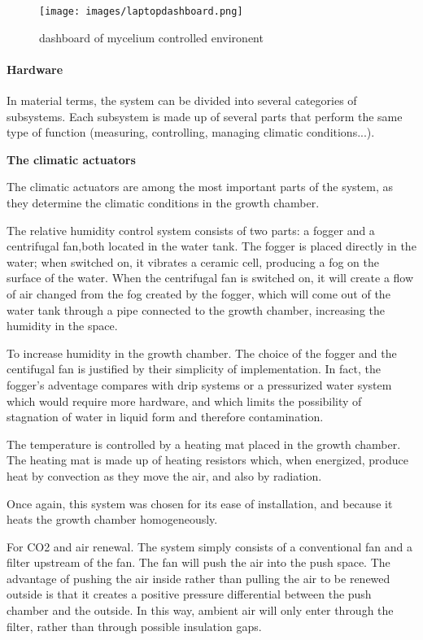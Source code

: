\begin{figure}[h]
    \centering
    \texttt{[image: images/laptopdashboard.png]}
    \caption{dashboard of mycelium controlled environent}
    \label{fig:Mycemachinne}
\end{figure} 

\paragraph{Hardware}

In material terms, the system can be divided into several categories of subsystems. 
Each subsystem is made up of several parts that perform the same type of function (measuring, controlling, managing climatic conditions...). 

\textbf{The climatic actuators} 

The climatic actuators are among the most important parts of the system, as they determine the climatic conditions in the growth chamber. 

The relative humidity control system consists of two parts: a fogger and a centrifugal fan,both located in the water tank. 
The fogger is placed directly in the water; when switched on, it vibrates a ceramic cell, producing a fog on the surface of the water. 
When the centrifugal fan is switched on, it will create a flow of air changed from the fog created by the fogger, which will come out of the water tank through a pipe connected to the growth chamber, increasing the humidity in the space. 

To increase humidity in the growth chamber. The choice of the fogger and the centifugal fan is justified by their simplicity of implementation. In fact, the fogger's adventage compares with drip systems or a pressurized water system which would require more hardware, and which limits the possibility of stagnation of water in liquid form and therefore contamination. 

The temperature is controlled by a heating mat placed in the growth chamber. The heating mat is made up of heating resistors which, when energized, produce heat by convection as they move the air, and also by radiation. 

Once again, this system was chosen for its ease of installation, and because it heats the growth chamber homogeneously. 

For CO2 and air renewal. The system simply consists of a conventional fan and a filter upstream of the fan.  The fan will push the air into the push space. The advantage of pushing the air inside rather than pulling the air to be renewed outside is that it creates a positive pressure differential between the push chamber and the outside. In this way, ambient air will only enter through the filter, rather than through possible insulation gaps. 

